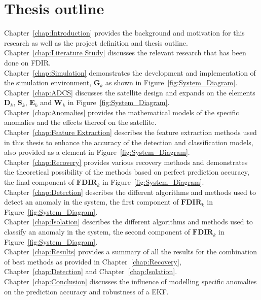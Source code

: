 \section{Thesis outline}
Chapter~\ref{chap:Introduction} provides the background and motivation for this research as well as the project definition and thesis outline.
\\
Chapter~\ref{chap:Literature Study} discusses the relevant research that has been done on FDIR.
\\
Chapter~\ref{chap:Simulation} demonstrates the development and implementation of the simulation environment, $\mathbf{G}_k$ as shown in Figure~\ref{fig:System_Diagram}.
\\
Chapter~\ref{chap:ADCS} discusses the satellite design and expands on the elements $\mathbf{D}_k$, $\mathbf{S}_k$, $\mathbf{E}_k$ and $\mathbf{W}_k$ in Figure~\ref{fig:System_Diagram}.
\\
Chapter~\ref{chap:Anomalies} provides the mathematical models of the specific anomalies and the effects thereof on the satellite.
\\
Chapter~\ref{chap:Feature Extraction} describes the feature extraction methods used in this thesis to enhance the accuracy of the detection and classification models, also provided as a element in Figure~\ref{fig:System_Diagram}.
\\
Chapter~\ref{chap:Recovery} provides various recovery methods and demonstrates the theoretical possibility of the methods based on perfect prediction accuracy, the final component of $\mathbf{FDIR}_k$ in Figure~\ref{fig:System_Diagram}.
\\
Chapter~\ref{chap:Detection} describes the different algorithms and methods used to detect an anomaly in the system, the first component of $\mathbf{FDIR}_k$ in Figure~\ref{fig:System_Diagram}.
\\
Chapter~\ref{chap:Isolation} describes the different algorithms and methods used to classify an anomaly in the system, the second component of $\mathbf{FDIR}_k$ in Figure~\ref{fig:System_Diagram}.
\\
Chapter~\ref{chap:Results} provides a summary of all the results for the combination of best methods as provided in Chapter~\ref{chap:Recovery}, Chapter~\ref{chap:Detection} and Chapter~\ref{chap:Isolation}.
\\
Chapter~\ref{chap:Conclusion} discusses the influence of modelling specific anomalies on the prediction accuracy and robustness of a EKF.